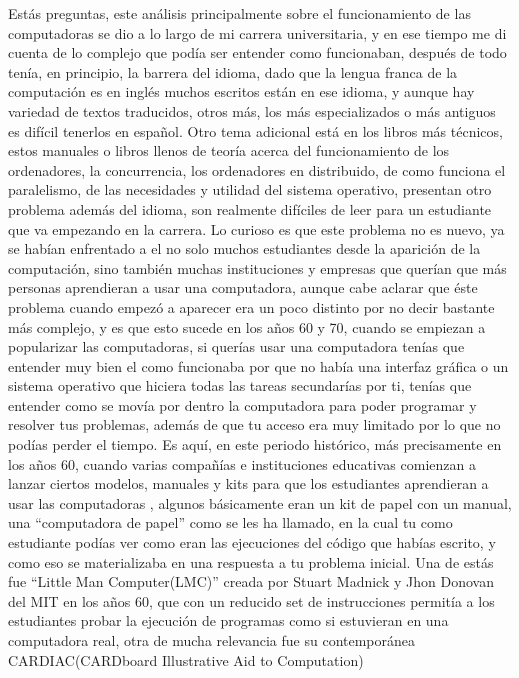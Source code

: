 \documentclass[letterpaper,12pt,oneside]{book}
\begin{document}
	 
	Estás preguntas, este análisis principalmente sobre el funcionamiento de las computadoras se dio a lo largo de mi carrera universitaria, y en ese tiempo me di cuenta de lo complejo que podía ser entender
	como funcionaban, después de todo tenía, en principio, la barrera del idioma, dado
	que la lengua franca de la computación es en inglés muchos escritos están en ese idioma, y aunque hay variedad de textos traducidos, otros más,  los más especializados
	o más antiguos es difícil tenerlos en español. Otro tema adicional está en los libros más técnicos, estos 
	manuales
	o libros llenos de teoría acerca del funcionamiento de los ordenadores, la concurrencia, los ordenadores en distribuido, de como funciona el paralelismo, de las necesidades y utilidad del sistema operativo, presentan otro problema además
	del idioma, 
	son realmente difíciles de leer para un estudiante que va empezando en la carrera. Lo curioso es que este problema no es nuevo, ya se habían enfrentado a el no solo muchos
	estudiantes desde la aparición de la computación, sino también muchas instituciones y empresas que querían que más personas aprendieran a usar una computadora,
	aunque cabe aclarar que éste problema cuando empezó a aparecer era un poco distinto por no decir bastante más complejo, y es que esto sucede en los años 60 y 70, cuando se empiezan a popularizar las computadoras, si querías usar una computadora tenías que entender muy bien el como funcionaba por que 
	no había una interfaz gráfica o un sistema operativo que hiciera todas las tareas secundarías por ti, tenías que entender como se movía por dentro la computadora para
	poder programar y resolver tus problemas, además de que tu acceso era muy limitado por lo que no podías perder el tiempo. Es aquí, en este periodo histórico, más precisamente en los años 60, cuando varias compañías e instituciones
	educativas comienzan a lanzar ciertos modelos, manuales y kits para que los estudiantes aprendieran a usar las computadoras
	, algunos básicamente eran un kit de papel con un manual, una ``computadora de papel'' como se les ha llamado, en la cual tu como estudiante
	podías ver como eran las ejecuciones del código que habías escrito, y como eso se materializaba en una respuesta a tu problema inicial. Una de estás fue 
	``Little Man Computer(LMC)'' creada por Stuart Madnick y Jhon Donovan del MIT en los años 60, que con un reducido set de instrucciones permitía a los estudiantes probar la
	ejecución de programas como si estuvieran en una computadora real, otra de mucha relevancia fue su contemporánea CARDIAC(CARDboard Illustrative Aid to Computation) 
\end{document}
